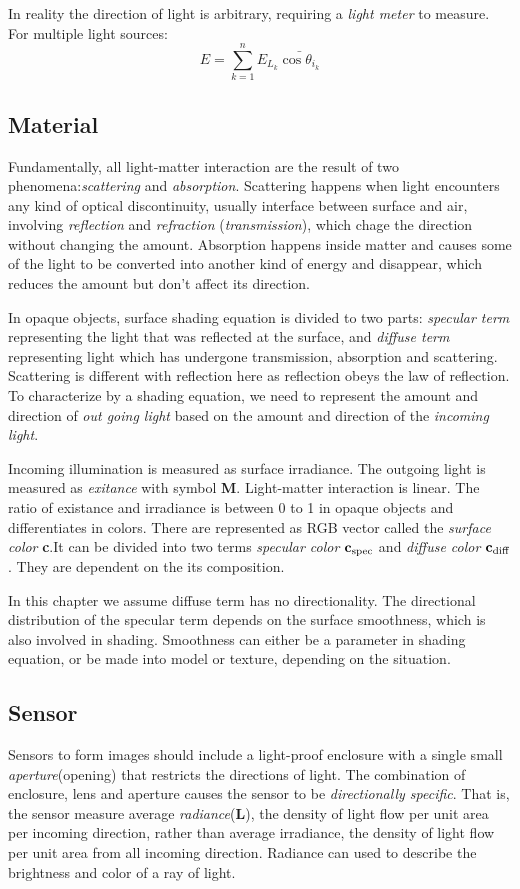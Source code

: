 \documentclass[10pt, a4paper]{article}
\begin{document}
        In reality the direction of light is arbitrary, requiring a \emph{light meter} to measure. For multiple light sources: 
        $$E = \sum_{k = 1}^{n}E_{L_k}\bar{\cos{\theta_{i_k}}}$$
    
    \subsection{Material}
        Fundamentally, all light-matter interaction are the result of two phenomena:\emph{scattering} and \emph{absorption}. Scattering happens when light encounters any kind of optical discontinuity, usually interface between surface and air, involving \emph{reflection} and \emph{refraction} (\emph{transmission}), which chage the direction without changing the amount. Absorption happens inside matter and causes some of the light to be converted into another kind of energy and disappear, which reduces the amount but don't affect its direction. 
        
        In opaque objects, surface shading equation is divided to two parts: \emph{specular term} representing the light that was reflected at the surface, and \emph{diffuse term} representing light which has undergone transmission, absorption and scattering. Scattering is different with reflection here as reflection obeys the law of reflection. To characterize by a shading equation, we need to represent the amount and direction of \emph{out going light} based on the amount and direction of the \emph{incoming light}.

        Incoming illumination is measured as surface irradiance. The outgoing light is measured as \emph{exitance} with symbol \textbf{M}. Light-matter interaction is linear. The ratio of existance and irradiance is between 0 to 1 in opaque objects and differentiates in colors. There are represented as RGB vector called the \emph{surface color} \textbf{c}.It can be divided into two terms \emph{specular color} $\textbf{c}_{\rm{spec}}$ and \emph{diffuse color} $\textbf{c}_{\rm{diff}}$. They are dependent on the its composition.
        
        In this chapter we assume diffuse term has no directionality. The directional distribution of the specular term depends on the surface smoothness, which is also involved in shading. Smoothness can either be a parameter in shading equation, or be made into model or texture, depending on the situation. 

    \subsection{Sensor}
        Sensors to form images should include a light-proof enclosure with a single small \emph{aperture}(opening) that restricts the directions of light. The combination of enclosure, lens and aperture causes the sensor to be \emph{directionally specific}. That is, the sensor measure average \emph{radiance}($\textbf{L}$), the density of light flow per unit area per incoming direction, rather than average irradiance, the density of light flow per unit area from all incoming direction. Radiance can used to describe the brightness and color of a ray of light. 
\end{document}
